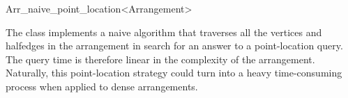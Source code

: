 
\ccRefPageBegin

\begin{ccRefClass}{Arr_naive_point_location<Arrangement>}
\label{arr_ref:naive_pl}

\ccDefinition
The \ccRefName{} class implements a naive algorithm that traverses
all the vertices and halfedges in the arrangement in search for an
answer to a point-location query.
The query time is therefore linear in the complexity of the arrangement.
Naturally, this point-location strategy could turn into a heavy
time-consuming process when applied to dense arrangements.


\ccIsModel
 \\

\ccSeeAlso
\\
\\
\\
  
\end{ccRefClass}

\ccRefPageEnd
